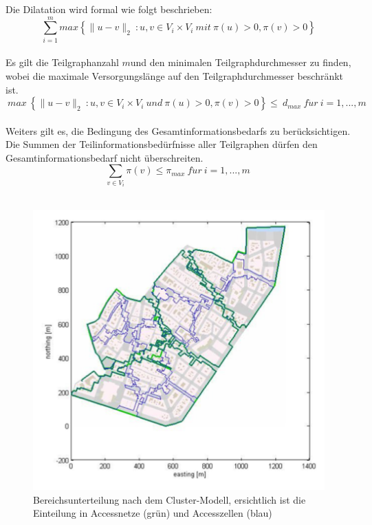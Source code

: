 \par Die Dilatation wird formal wie folgt beschrieben: 
\\
\begin{equation}
\sum_{i=1}^{m}  max \left\lbrace\| u-v \|_{2} ~:u,v \in V_{i} \times V_{i} ~ mit ~\pi(u) >0,\pi(v) >0\right\rbrace
\end{equation} 
\\
Es gilt die Teilgraphanzahl $m$und den minimalen Teilgraphdurchmesser zu finden,  wobei die maximale Versorgungslänge auf den Teilgraphdurchmesser beschränkt ist.
\\
\begin{equation} 
~max~\left\lbrace\| u-v \|_{2}~:u,v \in V_{i} \times V_{i} ~ und~\pi(u)>0,\pi(v)>0\right\rbrace\leq ~ d_{max} ~f\ddot{u}r~ i=1,...,m  
\end{equation} 
\\
Weiters gilt es, die Bedingung des Gesamtinformationsbedarfs zu berücksichtigen. Die Summen der Teilinformationsbedürfnisse aller Teilgraphen dürfen den Gesamtinformationsbedarf nicht überschreiten.
\\
\begin{equation}
\sum_{v\in V_{i}} \pi(v) \leq \pi_{max}  ~f\ddot{u}r~  i=1,...,m ~   
\end{equation} 
\\
\begin{figure}[H]
    \centerline{\includegraphics[scale=0.5]{pics/Cluster_Abbildung.png}}
    \caption[Bereichsunterteilung in Cluster]{\label{FiG:Bereichsunterteilung in Cluster } 
	Bereichsunterteilung nach dem Cluster-Modell, ersichtlich ist die Einteilung in Accessnetze (grün) und Accesszellen (blau)\cite{tech_rep_1} }
\end{figure}

